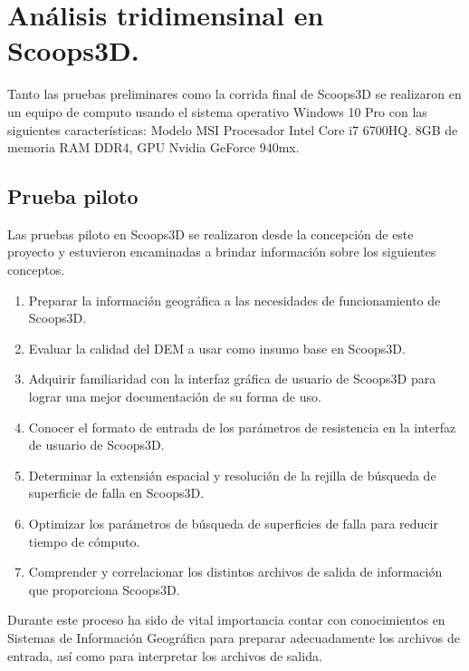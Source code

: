\chapter{An\'alisis tridimensinal en Scoops3D.}
\label{chap_analisisEnScoops}

Tanto las pruebas preliminares como la corrida final de Scoops3D se realizaron en un equipo de computo usando el sistema operativo Windows 10 Pro con las siguientes caracter\'{i}sticas: Modelo MSI Procesador Intel Core i7 6700HQ. 8GB de memoria RAM DDR4, GPU Nvidia GeForce 940mx.

\section{Prueba piloto} 

Las pruebas piloto en Scoops3D se realizaron desde la concepci\'on de este proyecto y estuvieron encaminadas a brindar informaci\'on sobre los siguientes conceptos.

\begin{enumerate}
  \item Preparar la informaci\'{\o}n geogr\'{a}fica a las necesidades de funcionamiento de Scoops3D.
  \item Evaluar la calidad del DEM a usar como insumo base en Scoops3D.
  \item Adquirir familiaridad con la interfaz gr\'{a}fica de usuario de Scoops3D para lograr una mejor documentaci\'on de su forma de uso.
  \item Conocer el formato de entrada de los par\'{a}metros de resistencia en la interfaz de usuario de Scoops3D.
  \item Determinar la extensi\'{\o}n espacial y resoluci\'{\o}n de la rejilla de b\'{u}squeda de superficie de falla en Scoops3D.
  \item Optimizar los par\'{a}metros de b\'{u}squeda de superficies de falla para reducir tiempo de c\'omputo.
  \item Comprender y correlacionar los distintos archivos de salida de informaci\'{\o}n que proporciona Scoops3D.
\end{enumerate}

Durante este proceso ha sido de vital importancia contar con conocimientos en Sistemas de Informaci\'on Geogr\'afica para preparar adecuadamente los archivos de entrada, as\'i como para interpretar los archivos de salida.
